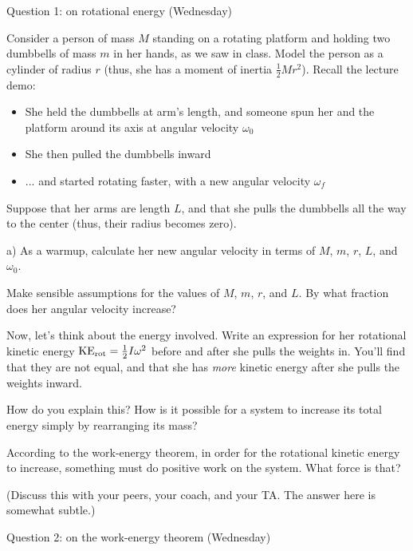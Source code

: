 \documentclass[12pt]{article}
\begin{document}
\Large
\centerline{}
\normalsize
\centerline{}
\small

\medskip

\centerline{\large Question 1: on rotational energy (Wednesday)} 

\medskip

Consider a person of mass $M$ standing on a rotating platform and holding two dumbbells of 
mass $m$
in her hands, as we saw in class. Model the person as a cylinder of radius $r$ (thus, she has
a moment of inertia $\frac{1}{2}Mr^2$). Recall the lecture demo:

\begin{itemize}
\item{She held the dumbbells at arm's length, and someone spun her and the platform around
its axis at angular velocity $\omega_0$}
\item{She then pulled the dumbbells inward}
\item{... and started rotating faster, with a new angular velocity $\omega_f$}
\end{itemize}

Suppose that her arms are length $L$, and that she pulls the dumbbells all the way to the 
center (thus, their radius becomes zero).

a) As a warmup, calculate her new angular velocity in terms of $M$, $m$, $r$, $L$, and $\omega_0$. 

Make sensible assumptions for the values of $M$, $m$, $r$, and $L$. By what fraction does
her angular velocity increase?

\newpage

Now, let's think about the energy involved. Write an expression for her rotational kinetic
energy ${\rm KE}_{\rm rot}=\frac{1}{2}I\omega^2$ before and after she pulls the weights in. You'll find that they are not equal, and
that she has {\it more} kinetic energy after she pulls the weights inward.

How do you explain this? How is it possible for a system to increase its total energy
simply by rearranging its mass?

According to the work-energy theorem, in order for the rotational kinetic energy to increase,
something must do positive work on the system. What force is that?

(Discuss this with your peers, your coach, and your TA. The answer here is somewhat subtle.)

\newpage
\centerline{\large Question 2: on the work-energy theorem (Wednesday)} 
\end{document}
